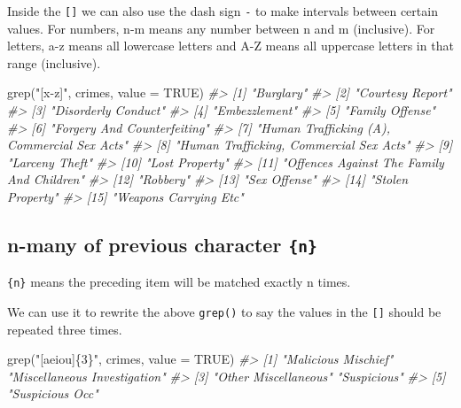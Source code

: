 \documentclass[
]{krantz}
\makeatletter
\newenvironment{Shaded}{\begin{snugshade}}{\end{snugshade}}
\newcommand{\AttributeTok}[1]{\textcolor[rgb]{0.61,0.61,0.61}{#1}}
\newcommand{\CommentTok}[1]{\textcolor[rgb]{0.37,0.37,0.37}{\textit{#1}}}
\newcommand{\ConstantTok}[1]{\textcolor[rgb]{0,0,0}{#1}}
\newcommand{\FunctionTok}[1]{\textcolor[rgb]{0,0,0}{#1}}
\newcommand{\NormalTok}[1]{#1}
\newcommand{\StringTok}[1]{\textcolor[rgb]{0.5,0.5,0.5}{#1}}
\newenvironment{kframe}{%
\medskip{}
\setlength{\fboxsep}{.8em}
 \def\at@end@of@kframe{}%
 \ifinner\ifhmode%
  \def\at@end@of@kframe{\end{minipage}}%
  \begin{minipage}{\columnwidth}%
 \fi\fi%
 \def\FrameCommand##1{\hskip\@totalleftmargin \hskip-\fboxsep
 \colorbox{shadecolor}{##1}\hskip-\fboxsep
     \hskip-\linewidth \hskip-\@totalleftmargin \hskip\columnwidth}%
 \MakeFramed {\advance\hsize-\width
   \@totalleftmargin\z@ \linewidth\hsize
   \@setminipage}}%
 {\par\unskip\endMakeFramed%
 \at@end@of@kframe}
\renewenvironment{Shaded}{\begin{kframe}}{\end{kframe}}
\makeatother
\begin{document}
Inside the \texttt{{[}{]}} we can also use the dash sign \texttt{-} to make intervals between certain values. For numbers, n-m means any number between n and m (inclusive). For letters, a-z means all lowercase letters and A-Z means all uppercase letters in that range (inclusive).

\begin{Shaded}
\begin{Highlighting}[]
\FunctionTok{grep}\NormalTok{(}\StringTok{"[x{-}z]"}\NormalTok{, crimes, }\AttributeTok{value =} \ConstantTok{TRUE}\NormalTok{)}
\CommentTok{\#\textgreater{}  [1] "Burglary"                                  }
\CommentTok{\#\textgreater{}  [2] "Courtesy Report"                           }
\CommentTok{\#\textgreater{}  [3] "Disorderly Conduct"                        }
\CommentTok{\#\textgreater{}  [4] "Embezzlement"                              }
\CommentTok{\#\textgreater{}  [5] "Family Offense"                            }
\CommentTok{\#\textgreater{}  [6] "Forgery And Counterfeiting"                }
\CommentTok{\#\textgreater{}  [7] "Human Trafficking (A), Commercial Sex Acts"}
\CommentTok{\#\textgreater{}  [8] "Human Trafficking, Commercial Sex Acts"    }
\CommentTok{\#\textgreater{}  [9] "Larceny Theft"                             }
\CommentTok{\#\textgreater{} [10] "Lost Property"                             }
\CommentTok{\#\textgreater{} [11] "Offences Against The Family And Children"  }
\CommentTok{\#\textgreater{} [12] "Robbery"                                   }
\CommentTok{\#\textgreater{} [13] "Sex Offense"                               }
\CommentTok{\#\textgreater{} [14] "Stolen Property"                           }
\CommentTok{\#\textgreater{} [15] "Weapons Carrying Etc"}
\end{Highlighting}
\end{Shaded}

\hypertarget{n-many-of-previous-character-n}{%
\subsection{\texorpdfstring{n-many of previous character \texttt{\{n\}}}{n-many of previous character \{n\}}}\label{n-many-of-previous-character-n}}

\texttt{\{n\}} means the preceding item will be matched exactly n times.

We can use it to rewrite the above \texttt{grep()} to say the values in the \texttt{{[}{]}} should be repeated three times.

\begin{Shaded}
\begin{Highlighting}[]
\FunctionTok{grep}\NormalTok{(}\StringTok{"[aeiou]\{3\}"}\NormalTok{, crimes, }\AttributeTok{value =} \ConstantTok{TRUE}\NormalTok{)}
\CommentTok{\#\textgreater{} [1] "Malicious Mischief"          "Miscellaneous Investigation"}
\CommentTok{\#\textgreater{} [3] "Other Miscellaneous"         "Suspicious"                 }
\CommentTok{\#\textgreater{} [5] "Suspicious Occ"}
\end{Highlighting}
\end{Shaded}
\end{document}
